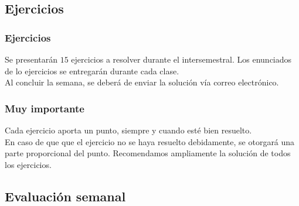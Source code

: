 \documentclass[12pt]{beamer}
\begin{document}
\subsection{Ejercicios}

\begin{frame}
\frametitle{Ejercicios}
Se presentarán $15$ ejercicios a resolver durante el intersemestral. Los enunciados de lo ejercicios se entregarán durante cada clase.
\\
\bigskip
\pause
Al concluir la semana, se deberá de enviar la solución vía correo electrónico.
\end{frame}
\begin{frame}
\frametitle{Muy importante}
Cada ejercicio aporta un punto, siempre y cuando esté bien resuelto.
\\
\bigskip
\pause
En caso de que que el ejercicio no se haya resuelto debidamente, se otorgará una parte proporcional del punto. Recomendamos ampliamente la solución de todos los ejercicios.
\end{frame}

\subsection{Evaluación semanal}
\end{document}
